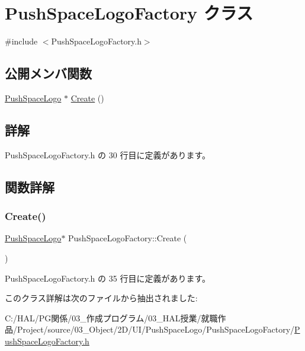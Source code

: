 \hypertarget{class_push_space_logo_factory}{}\section{Push\+Space\+Logo\+Factory クラス}
\label{class_push_space_logo_factory}


{\ttfamily \#include $<$Push\+Space\+Logo\+Factory.\+h$>$}

\subsection*{公開メンバ関数}
\begin{DoxyCompactItemize}
\item 
\mbox{\hyperlink{class_push_space_logo}{Push\+Space\+Logo}} $\ast$ \mbox{\hyperlink{class_push_space_logo_factory_a40ed4a7781d8f5a6e802b90f3aa599cb}{Create}} ()
\end{DoxyCompactItemize}


\subsection{詳解}


 Push\+Space\+Logo\+Factory.\+h の 30 行目に定義があります。



\subsection{関数詳解}
\mbox{\label{class_push_space_logo_factory_a40ed4a7781d8f5a6e802b90f3aa599cb}} 
\subsubsection{\texorpdfstring{Create()}{Create()}}
{\footnotesize\ttfamily \mbox{\hyperlink{class_push_space_logo}{Push\+Space\+Logo}}$\ast$ Push\+Space\+Logo\+Factory\+::\+Create (\begin{DoxyParamCaption}{ }\end{DoxyParamCaption})\hspace{0.3cm}{\ttfamily [inline]}}



 Push\+Space\+Logo\+Factory.\+h の 35 行目に定義があります。



このクラス詳解は次のファイルから抽出されました\+:\begin{DoxyCompactItemize}
\item 
C\+:/\+H\+A\+L/\+P\+G関係/03\+\_\+作成プログラム/03\+\_\+\+H\+A\+L授業/就職作品/\+Project/source/03\+\_\+\+Object/2\+D/\+U\+I/\+Push\+Space\+Logo/\+Push\+Space\+Logo\+Factory/\mbox{\hyperlink{_push_space_logo_factory_8h}{Push\+Space\+Logo\+Factory.\+h}}\end{DoxyCompactItemize}
